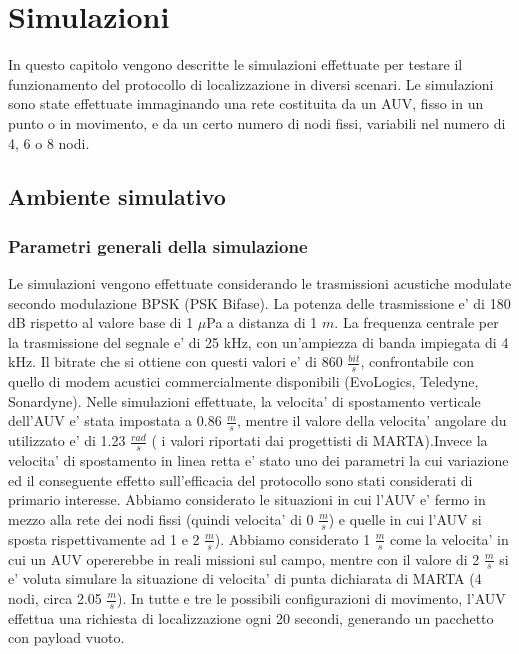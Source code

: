 \chapter{Simulazioni}
In questo capitolo vengono descritte le simulazioni effettuate per testare il funzionamento del protocollo di localizzazione in diversi scenari. \newline Le simulazioni sono state effettuate immaginando una rete costituita da un AUV, fisso in un punto o in movimento, e da un certo numero di nodi fissi, variabili nel numero di 4, 6 o 8 nodi.

\section{Ambiente simulativo}

\subsection{Parametri generali della simulazione}
\par
Le simulazioni vengono effettuate considerando le trasmissioni acustiche modulate secondo modulazione BPSK (PSK Bifase). La potenza delle trasmissione e' di 180 dB rispetto al valore base di 1 $\mu$Pa a distanza di 1 $m$. La frequenza centrale per la trasmissione del segnale e' di 25 kHz, con un'ampiezza di banda impiegata di 4 kHz. Il bitrate che si ottiene con questi valori e' di 860 $\frac{bit}{s}$, confrontabile con quello di modem acustici commercialmente disponibili (EvoLogics, Teledyne, Sonardyne).
Nelle simulazioni effettuate, la velocita' di spostamento verticale dell'AUV e' stata impostata a 0.86 \(\frac{m}{s}\), mentre il valore della velocita' angolare du  utilizzato e' di 1.23 \(\frac{rad}{s}\) ( i valori riportati dai progettisti di MARTA).\newline Invece la velocita' di spostamento in linea retta e' stato uno dei parametri la cui variazione ed il conseguente effetto sull'efficacia del protocollo sono stati considerati di primario interesse. \newline Abbiamo considerato le situazioni in cui l'AUV e' fermo in mezzo alla rete dei nodi fissi (quindi velocita' di 0 \(\frac{m}{s}\)) e quelle in cui l'AUV si sposta rispettivamente ad 1 e 2 \(\frac{m}{s}\)). Abbiamo considerato 1 $\frac{m}{s}$ come la velocita' in cui un AUV opererebbe in reali missioni sul campo, mentre con il valore di 2 $\frac{m}{s}$ si e' voluta simulare la situazione di velocita' di punta dichiarata di MARTA (4 nodi, circa 2.05 $\frac{m}{s}$). In tutte e tre le possibili configurazioni di movimento, l'AUV effettua una richiesta di localizzazione ogni 20 secondi, generando un pacchetto con payload vuoto.
